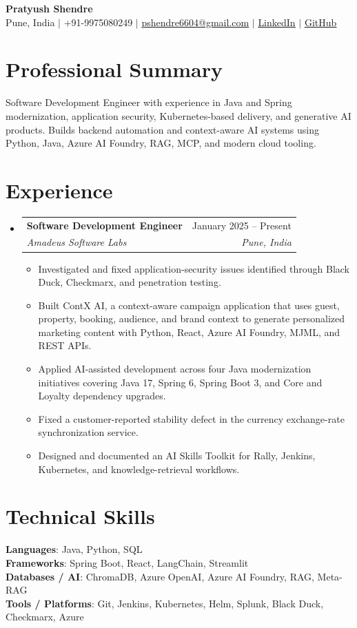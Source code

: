 \documentclass[a4paper,11pt]{article}
\makeatletter
\newcommand{\resumeItem}[1]{\item\small{#1\vspace{-2pt}}}
\newcommand{\resumeSubheading}[4]{
  \vspace{-2pt}\item
    \begin{tabularx}{0.97\textwidth}[t]{@{}>{\raggedright\arraybackslash}X@{\hspace{0.75em}}r@{}}
      \textbf{#1} & #2 \\
      \textit{\small#3} & \textit{\small #4} \\
    \end{tabularx}\vspace{-5pt}
}
\newcommand{\resumeSubItemListStart}{\begin{itemize}[leftmargin=0.15in, label={}]}
\newcommand{\resumeSubItemListEnd}{\end{itemize}}
\newcommand{\resumeItemListStart}{\begin{itemize}}
\newcommand{\resumeItemListEnd}{\end{itemize}\vspace{-5pt}}
\makeatother
\begin{document}
\begin{center}
  {\Huge\bfseries Pratyush Shendre} \\ \vspace{1pt}
  \small Pune, India $|$ +91-9975080249 $|$
  \href{mailto:pshendre6604@gmail.com}{\underline{pshendre6604@gmail.com}} $|$
  \href{https://linkedin.com/in/pratyush-shendre-2256a7223/}{\underline{LinkedIn}} $|$
  \href{https://github.com/PratyushS04}{\underline{GitHub}}
\end{center}

\section{Professional Summary}
\small{Software Development Engineer with experience in Java and Spring modernization, application security, Kubernetes-based delivery, and generative AI products. Builds backend automation and context-aware AI systems using Python, Java, Azure AI Foundry, RAG, MCP, and modern cloud tooling.}

\section{Experience}
\resumeSubItemListStart
  \resumeSubheading
    {Software Development Engineer}{January 2025 -- Present}
    {Amadeus Software Labs}{Pune, India}
    \resumeItemListStart
      \resumeItem{Investigated and fixed application-security issues identified through Black Duck, Checkmarx, and penetration testing.}
      \resumeItem{Built ContX AI, a context-aware campaign application that uses guest, property, booking, audience, and brand context to generate personalized marketing content with Python, React, Azure AI Foundry, MJML, and REST APIs.}
      \resumeItem{Applied AI-assisted development across four Java modernization initiatives covering Java 17, Spring 6, Spring Boot 3, and Core and Loyalty dependency upgrades.}
      \resumeItem{Fixed a customer-reported stability defect in the currency exchange-rate synchronization service.}
      \resumeItem{Designed and documented an AI Skills Toolkit for Rally, Jenkins, Kubernetes, and knowledge-retrieval workflows.}
    \resumeItemListEnd
\resumeSubItemListEnd

\section{Technical Skills}
\begin{itemize}[leftmargin=0.15in, label={}]
  \small{\item{
    \textbf{Languages}{: Java, Python, SQL} \\
    \textbf{Frameworks}{: Spring Boot, React, LangChain, Streamlit} \\
    \textbf{Databases / AI}{: ChromaDB, Azure OpenAI, Azure AI Foundry, RAG, Meta-RAG} \\
    \textbf{Tools / Platforms}{: Git, Jenkins, Kubernetes, Helm, Splunk, Black Duck, Checkmarx, Azure}
  }}
\end{itemize}
\end{document}
